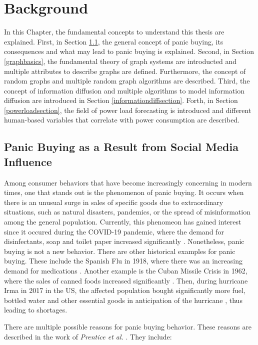 \chapter{Background}
\label{background}

In this Chapter, the fundamental concepts to understand 
this thesis are explained.
First, in Section \ref{panicbuying}, 
the general concept of panic buying,
its consequences and what may lead to panic buying is explained.
Second, in Section \ref{graphbasics}, 
the fundamental theory of graph systems are 
introducted and multiple attributes to describe graphs are defined.
Furthermore, the concept of random graphs and multiple random 
graph algorithms are described.
Third, the concept of information diffusion
and multiple algorithms to model information diffusion are introduced
in Section \ref{informationdiffsection}.
Forth, in Section \ref{powerloadsection}, 
the field of power load forecasting is introduced and 
different human-based variables that 
correlate with power consumption are described.


\section{Panic Buying as a Result from Social Media Influence}
\label{panicbuying}

Among consumer behaviors that have become increasingly concerning in modern times, 
one that stands out is the phenomenon of panic buying.
It occurs when there is an unusual surge in sales of 
specific goods due to extraordinary situations, such as natural disasters, 
pandemics, or the spread of misinformation among the general population.
Currently, this phenomeon has gained interest since it occured
during the COVID-19 pandemic,
where the demand for disinfectants, soap and toilet paper increased significantly
\cite{covidpanicbuying}. Nonetheless, panic buying is not a new behavior.
There are other historical examples for panic buying.
These include the Spanish Flu
in 1918, where there was an increasing demand for medications 
\cite{honigsbaum2013regulating}. Another example is the Cuban Missile Crisis 
in 1962, where the sales of canned foods increased significantly 
\cite{george2004awaiting}. 
Then, during hurricane Irma in 2017 in the US, the affected population bought
significantly more fuel, bottled water 
and other essential goods in anticipation of the hurricane \cite{irmahurricane},
thus leading to shortages.

There are multiple possible reasons for panic buying behavior. These reasons 
are described in the work of \textit{Prentice et al.}
\cite{prentice2022antecedents}. They include:

